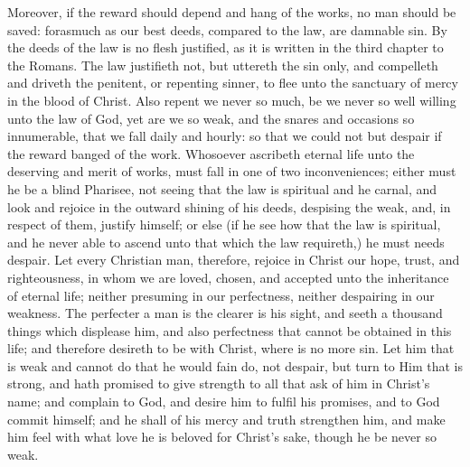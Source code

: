 Moreover, if the reward should depend and hang of the 
works, no man should be saved: forasmuch as our best
deeds, compared to the law, are damnable sin. By the
deeds of the law is no flesh justified, as it is written in the
third chapter to the Romans. The law justifieth not, but
uttereth the sin only, and compelleth and driveth the
penitent, or repenting sinner, to flee unto the sanctuary of 
mercy in the blood of Christ. Also repent we never so 
much, be we never so well willing unto the law of God, 
yet are we so weak, and the snares and occasions so innumerable,
that we fall daily and hourly: so that we could 
not but despair if the reward banged of the work. Whosoever
ascribeth eternal life unto the deserving and merit 
of works, must fall in one of two inconveniences; either 
must he be a blind Pharisee, not seeing that the law 
is spiritual and he carnal, and look and rejoice in the outward
shining of his deeds, despising the weak, and, in 
respect of them, justify himself; or else (if he see how 
that the law is spiritual, and he never able to ascend unto 
that which the law requireth,) he must needs despair. 
Let every Christian man, therefore, rejoice in Christ our 
hope, trust, and righteousness, in whom we are loved, 
chosen, and accepted unto the inheritance of eternal life; 
neither presuming in our perfectness, neither despairing 
in our weakness. The perfecter a man is the clearer is 
his sight, and seeth a thousand things which displease 
him, and also perfectness that cannot be obtained in this 
life; and therefore desireth to be with Christ, where 
is no more sin. Let him that is weak and cannot do that 
he would fain do, not despair, but turn to Him that is 
strong, and hath promised to give strength to all that ask 
of him in Christ's name; and complain to God, and desire 
him to fulfil his promises, and to God commit himself; 
and he shall of his mercy and truth strengthen him, and 
make him feel with what love he is beloved for Christ's 
sake, though he be never so weak. 


